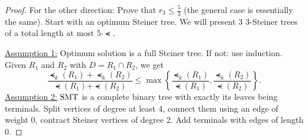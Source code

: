 \documentclass[../skript.tex]{subfiles}
\begin{document}
\begin{proof}
For the other direction: Prove that $r_3 \leq \frac{5}{3}$ (the general case is essentially the same).
Start with an optimum Steiner tree. We will present 3 3-Steiner trees of a total length at most $5 \cdot \smt$.

\underline{Assumption 1:} Optimum solution is a full Steiner tree. If not: use induction.
Given $R_1$ and $R_2$ with $D = R_1 \cap R_2$, we get
\[
\frac{\smt_k(R_1) + \smt_k(R_2)}{\smt(R_1) + \smt(R_2)} \leq \max \left\{ \frac{\smt_k(R_1)}{\smt(R_1)}, \frac{\smt_k(R_2)}{\smt(R_2)} \right\}.
\]
\underline{Assumption 2:} $\operatorname{SMT}$ is a complete binary tree with exactly its leaves being terminals.
Split vertices of degree at least 4, connect them using an edge of weight 0, contract Steiner vertices of degree 2. Add terminals with edges of length 0.
\end{proof}
\end{document}
